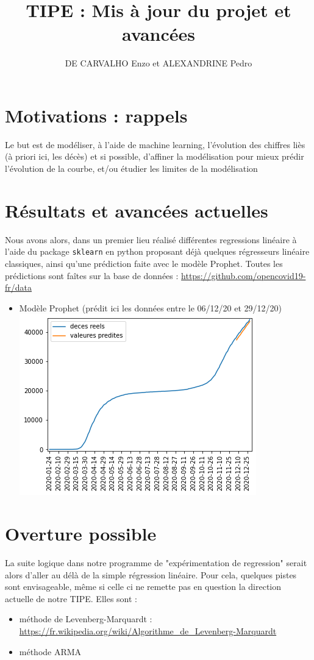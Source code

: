 \documentclass[a4paper,11pt]{article}
\date{}
\title{TIPE : Mis à jour du projet et avancées}
\author{DE CARVALHO Enzo et ALEXANDRINE Pedro}
\begin{document}
\maketitle
\section{Motivations : rappels}
	Le but est de modéliser, à l'aide de machine learning, l'évolution des 
	chiffres liès (à priori ici, les décès) et si possible, d'affiner la 			modélisation pour mieux prédir l'évolution de la courbe, et/ou étudier 			les limites de la modélisation

\section{Résultats et avancées actuelles}
	Nous avons alors, dans un premier lieu réalisé différentes regressions
	linéaire à l'aide du package \texttt{sklearn} en python proposant déjà
	quelques régresseurs linéaire classiques, ainsi qu'une prédiction
	faite avec le modèle Prophet.
	Toutes les prédictions sont faîtes sur la base de données :
	\url{https://github.com/opencovid19-fr/data}
	\begin{itemize}
		\item Modèle Prophet (prédit ici les données entre le 06/12/20
		 et 29/12/20)\\
		\includegraphics[scale=1]{Figure_Prophet}
	\end{itemize}

\section{Overture possible}
	La suite logique dans notre programme de "expérimentation de
	regression" serait alors d'aller au délà de la simple régression
	linéaire.
	Pour cela, quelques pistes sont envisageable, même si celle ci ne
	remette pas en question la direction actuelle de notre TIPE.
	Elles sont :
	\begin{itemize}
		\item méthode de Levenberg-Marquardt :\\ 
		\url{https://fr.wikipedia.org/wiki/Algorithme_de_Levenberg-Marquardt}
		\item méthode ARMA
	\end{itemize}
\end{document}
